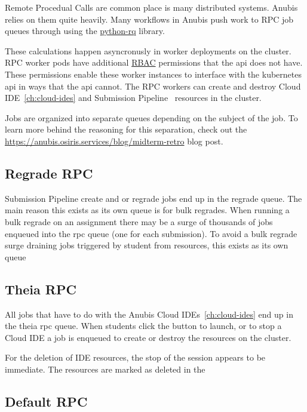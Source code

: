 Remote Procedual Calls are common place is many distributed systems.
Anubis relies on them quite heavily.
Many workflows in Anubis push work to RPC job queues through using the
\href{https://python-rq.org}{python-rq} library.

These calculations happen asyncronusly in worker deployments on the cluster.
RPC worker pods have additional \href{https://kubernetes.io/docs/reference/access-authn-authz/rbac/}{RBAC}
permissions that the api does not have.
These permissions enable these worker instances to interface with the kubernetes api in ways
that the api cannot.
The RPC workers can create and destroy Cloud IDE~\ref{ch:cloud-ides}
and Submission Pipeline~ resources in the cluster.

Jobs are organized into separate queues depending on the subject of the job.
To learn more behind the reasoning for this separation, check out the
\href{Spring 2021 Midterm Retro}{https://anubis.osiris.services/blog/midterm-retro}
blog post.

\subsection{Regrade RPC}\label{subsec:regrade-rpc}

Submission Pipeline create and or regrade jobs end up in the regrade queue.
The main reason this exists as its own queue is for bulk regrades.
When running a bulk regrade on an assignment there may be a surge of thousands of
jobs enqueued into the rpc queue (one for each submission).
To avoid a bulk regrade surge draining jobs triggered by student from resources,
this exists as its own queue

\subsection{Theia RPC}\label{subsec:theia-rpc}

All jobs that have to do with the Anubis Cloud IDEs~\ref{ch:cloud-ides} end up in the theia rpc queue.
When students click the button to launch, or to stop a Cloud IDE a job is enqueued to create or destroy 
the resources on the cluster.

For the deletion of IDE resources, the stop of the session appears to be immediate.
The resources are marked as deleted in the 

\subsection{Default RPC}\label{subsec:default-rpc}
